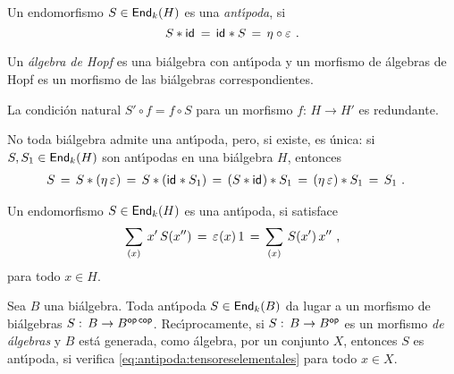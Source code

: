 \begin{defAntipoda}\label{def:antipoda}
	Un endomorfismo $S\in\Endo[k](H)$ es una \emph{ant\'{\i}poda}, si
	\begin{equation}
		\label{eq:antipoda}
		S\convol\id \,=\,\id\convol S\,=\,\unidad\circ\counidad
		\text{ .}
	\end{equation}
\end{defAntipoda}

\begin{defHopf}\label{def:hopf}
	Un \emph{\'{a}lgebra de Hopf} es una bi\'{a}lgebra con ant\'{\i}poda y
	un morfismo de \'{a}lgebras de Hopf es un morfismo de las
	bi\'{a}lgebras correspondientes.
\end{defHopf}

\begin{obsHopf}\label{obs:hopf}
	La condici\'{o}n natural $S'\circ f=f\circ S$ para un morfismo
	$f:\,H\rightarrow H'$ es redundante.
\end{obsHopf}

\begin{obsAntipoda}\label{obs:antipoda:unicidad}
	No toda bi\'{a}lgebra admite una ant\'{\i}poda, pero, si existe, es
	\'{u}nica: si $S,S_1\in\Endo[k](H)$ son ant\'{\i}podas en una
	bi\'{a}lgebra $H$, entonces
	\begin{align*}
		S & \,=\,S\convol(\unidad\,\counidad) \,=\,
			S\convol (\id\convol S_1) \,=\,
			(S\convol\id)\convol S_1 \,=\,
			(\unidad\,\counidad)\convol S_1 \,=\, S_1
		\text{ .}
	\end{align*}
\end{obsAntipoda}

\begin{obsAntipoda}\label{obs:antipoda:tensoreselementales}
	Un endomorfismo $S\in\Endo[k](H)$ es una ant\'{\i}poda, si satisface
	\begin{equation}
		\label{eq:antipoda:tensoreselementales}
		\sum_{(x)}\,x'\,S(x'') \,=\,\counidad(x)\,1 \,=\,
			\sum_{(x)}\,S(x')\,x''
		\text{ ,}
	\end{equation}
	para todo $x\in H$.
\end{obsAntipoda}

\begin{obsAntipoda}\label{obs:antipoda:morfismodealgebrasopuestas}
	Sea $B$ una bi\'{a}lgebra. Toda ant\'{\i}poda $S\in\Endo[k](B)$ da
	lugar a un morfismo de bi\'{a}lgebras
	$S:\,B\rightarrow B^{\opp\,\copp}$. Rec\'{\i}procamente, si
	$S:\,B\rightarrow B^\opp$ es un morfismo \emph{de \'{a}lgebras} y $B$
	est\'{a} generada, como \'{a}lgebra, por un conjunto $X$, entonces $S$
	es ant\'{\i}poda, si verifica \eqref{eq:antipoda:tensoreselementales}
	para todo $x\in X$.
\end{obsAntipoda}


